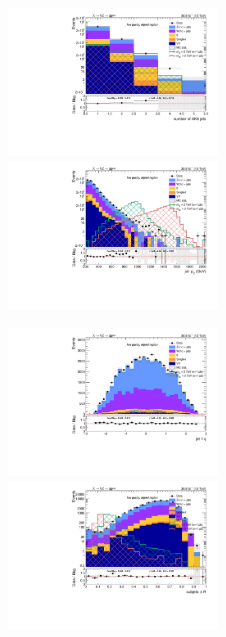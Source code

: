\begin{figure}[!htb]
  \begin{center}
    \includegraphics[width=0.495\textwidth]{plots/v9_thesis/XVZnnlpSR/nFatJets.pdf}  
    \includegraphics[width=0.495\textwidth]{plots/v9_thesis/XVZnnlpSR/FatJet1_pt.pdf}
    
    \includegraphics[width=0.495\textwidth]{plots/v9_thesis/XVZnnlpSR/FatJet1_eta.pdf}
    \includegraphics[width=0.495\textwidth]{plots/v9_thesis/XVZnnlpSR/FatJet1_dR.pdf}


\end{center}
\end{figure}
